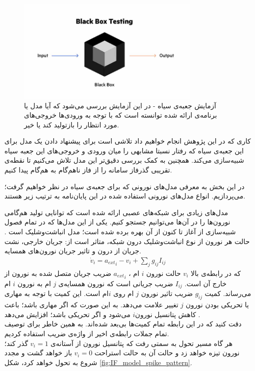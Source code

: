 \begin{figure}
	\centering
	\includegraphics[width=0.8\textwidth]{../Figures/Black_box_test.jpg}
	\caption{
		آزمایش جعبه‌ی سیاه - در این آزمایش بررسی می‌شود که آیا مدل یا برنامه‌ی ارائه شده توانسته است که با توجه به ورودی‌ها خروجی‌های مورد انتظار را بازتولید کند یا خیر.}
	\label{fig:black_box}
\end{figure}

  کاری که در این پژوهش انجام خواهیم داد تلاشی است برای پیشنهاد دادن یک مدل برای این جعبه‌ی سیاه که رفتار نسبتا مشابهی را میان ورودی و خروجی‌های این جعبه سیاه شبیه‌سازی می‌کند. همچنین به کمک بررسی دقیق‌تر این مدل تلاش می‌کنیم تا نقطه‌ی تقریبی گذرفاز سامانه را از فاز ناهم‌گام به هم‌گام پیدا کنیم.

در این بخش به معرفی مدل‌های نورونی که برای جعبه‌ی سیاه در نظر خواهیم گرفت؛ می‌پردازیم. انواع مدل‌های نورونی استفاده شده در این پایان‌نامه به ترتیب زیر هستند.

مدل‌های زیادی برای شبکه‌های عصبی ارائه شده است که توانایی تولید هم‌گامی نورون‌ها را در آن‌ها می‌توانیم جستجو کنیم. یکی از این مدل‌ها که در تمام فصول شبیه‌سازی از آغاز تا کنون از آن بهره برده شده است؛ مدل انباشت‌وشلیک  است
\cite{brunel2007quantitative, lapicque1907}. 
حالت هر نورون از نوع انباشت‌وشلیک درون شبکه، متاثر است از: جریان خارجی، نشت جریان از درون و تاثیر جریان نورون‌های همسایه.
\begin{align}
	\dot{v}_i = {a_{ext}}_i - v_i + \sum_j g_{ij} I_{ij}
\end{align}
که در رابطه‌ی بالا 
$v_i$
حالت نورون $i$ ام ،
${a_{ext}}_i$
ضریب جریان متصل شده به نورون از خارج آن است.
$I_{ij}$
ضریب جریانی است که نورون همسایه‌ی $j$ ام به نورون $i$ ام می‌رساند. کمیت
$g_{ij}$
ضریب تاثیر نورون $j$ ام روی $i$ام است. این کمیت با توجه به مهاری یا تحریکی بودن نورون $j$ تغییر علامت می‌دهد. به این صورت که اگر مهاری باشد؛ باعث کاهش پتانسیل نورون$i$ می‌شود و اگر تحریکی باشد؛ افزایش می‌دهد
\cite{Erö2018}.\\
دقت کنید که در این رابطه تمام کمیت‌ها بی‌بعد شده‌اند. به همین خاطر برای توصیف تمام جملات رابطه‌ی اخیر از واژه‌ی ضریب استفاده کردیم.\\
هر گاه مسیر تحول به سمتی رفت که پتانسیل نورون از آستانه‌ی 
$v_i = 1$
گذر کند؛ نورون تیزه خواهد زد و حالت آن به حالت استراحت
$v_i = 0$
باز خواهد گشت و مجدد شروع به تحول خواهد کرد، شکل
\ref{fig:IF_model_spike_pattern}.

